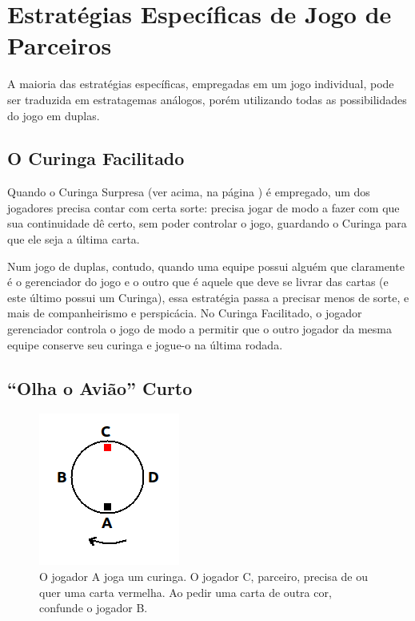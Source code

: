 \section{Estratégias Específicas de Jogo de Parceiros}

A maioria das estratégias específicas, empregadas em um jogo individual, pode ser traduzida em estratagemas análogos, porém utilizando todas as possibilidades do jogo em duplas.

\subsection{O Curinga Facilitado}

\label{curingafacil}

Quando o Curinga Surpresa (ver acima, na página \pageref{curingasurpresa}) é empregado, um dos jogadores precisa contar com certa sorte: precisa jogar de modo a fazer com que sua continuidade dê certo, sem poder controlar o jogo, guardando o Curinga para que ele seja a última carta.

Num jogo de duplas, contudo, quando uma equipe possui alguém que claramente é o gerenciador do jogo e o outro que é aquele que deve se livrar das cartas (e este último possui um Curinga), essa estratégia passa a precisar menos de sorte, e mais de companheirismo e perspicácia. No Curinga Facilitado, o jogador gerenciador controla o jogo de modo a permitir que o outro jogador da mesma equipe conserve seu curinga e jogue-o na última rodada. 

\subsection{``Olha o Avião'' Curto}

\label{aviaocurto}

\begin{figure}
  \begin{center}
    \includegraphics[scale=0.5]{fig7.png}
  \end{center}
  \caption{O jogador A joga um curinga. O jogador C, parceiro, precisa de ou quer uma carta vermelha. Ao pedir uma carta de outra cor, confunde o jogador B.}
\end{figure}

